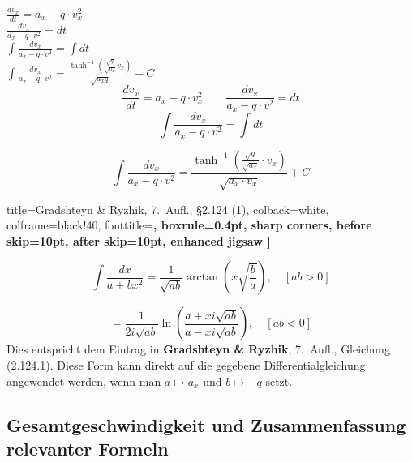 $\frac{dv_x}{dt} = a_x-q\cdot v_x^2 $\\
$\frac{dv_x}{a_x-q\cdot v^2} = dt$\\
$\int \frac{dv_x}{a_x-q\cdot v^2} = \int dt$\\
$\int \frac{dv_x}{a_x-q\cdot v^2} = \frac{\tanh^{-1}\!\left(\frac{\sqrt{q}}{\sqrt{a_x}} v_x\right)}{\sqrt{a_x q}} + C$\\


\[
\frac{dv_x}{dt} = a_x-q\cdot v_x^2 \qquad \frac{dv_x}{a_x-q\cdot v^2} = dt
\]
\[
\int \frac{dv_x}{a_x-q\cdot v^2} = \int dt
\]

\[
\int \frac{dv_x}{a_x-q\cdot v^2} = \frac{\tanh^{-1}(\frac{\sqrt{q}}{\sqrt{a_x}}\cdot v_x)}{\sqrt{a_x\cdot v_x}} + C
\]

title={Gradshteyn \& Ryzhik, 7.\ Aufl., §2.124 (1)},
colback=white,          %
colframe=black!40,      %
fonttitle=\bfseries,
boxrule=0.4pt,          %
sharp corners,          %
before skip=10pt,
after skip=10pt,
enhanced jigsaw
]

\begin{tcolorbox}[
	title={Aus Gradshteyn \& Ryzhik, 7.\ Aufl., §2.124 (1)},
	colback=gray!5,
	colframe=gray!60!black,
	fonttitle=\bfseries,
	sidebyside,    %
	sidebyside align=top,
	lefthand width=8cm
	]
	\[
	\int \frac{dx}{a + bx^2}
	= \frac{1}{\sqrt{ab}} \arctan\!\left(x\sqrt{\frac{b}{a}}\right),
	\quad [ab>0]
	\]
	
	\[
	= \frac{1}{2i\sqrt{ab}}
	\ln\!\left(\frac{a + xi\sqrt{ab}}{a - xi\sqrt{ab}}\right),
	\quad [ab<0]
	\]
	\tcblower
	Dies entspricht dem Eintrag in \textbf{Gradshteyn \& Ryzhik}, 7.\ Aufl., Gleichung (2.124.1).  
	Diese Form kann direkt auf die gegebene Differentialgleichung angewendet werden,
	wenn man $a \mapsto a_x$ und $b \mapsto -q$ setzt.
\end{tcolorbox}
\fi
\subsection{Gesamtgeschwindigkeit und Zusammenfassung relevanter Formeln}

